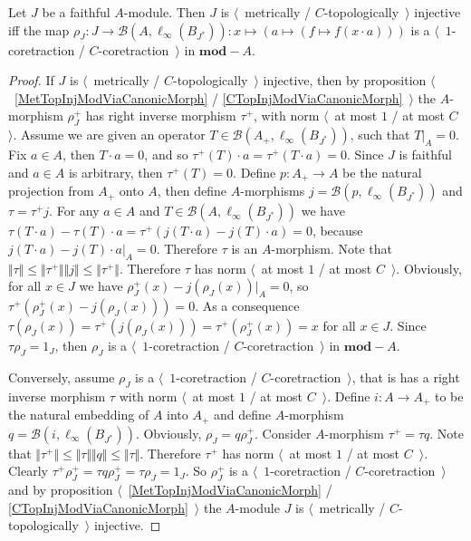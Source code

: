 \begin{proposition}\label{NonDegenMetTopInjCharac}  Let $J$ be a faithful $A$-module. Then $J$ is $\langle$~metrically / $C$-topologically~$\rangle$ injective iff the map $\rho_J:J\to\mathcal{B}(A,\ell_\infty(B_{J^*})):x\mapsto(a\mapsto(f\mapsto f(x\cdot a)))$ is a $\langle$~$1$-coretraction / $C$-coretraction~$\rangle$ in $\mathbf{mod}-A$.
\end{proposition} 
\begin{proof}
If $J$ is $\langle$~metrically / $C$-topologically~$\rangle$ injective, then by proposition $\langle$~\ref{MetTopInjModViaCanonicMorph} / \ref{CTopInjModViaCanonicMorph}~$\rangle$ the $A$-morphism $\rho_J^+$ has right inverse morphism $\tau^+$, with norm $\langle$~at most $1$ / at most $C$~$\rangle$. Assume we are given an operator $T\in \mathcal{B}(A_+,\ell_\infty(B_{J^*}))$, such that $T|_A=0$. Fix $a\in A$, then $T\cdot a=0$, and so $\tau^+(T)\cdot a=\tau^+(T\cdot a)=0$. Since $J$ is faithful and $a\in A$ is arbitrary, then $\tau^+(T)=0$. Define $p:A_+\to A$ be the natural projection from $A_+$ onto $A$, then define $A$-morphisms $j=\mathcal{B}(p,\ell_\infty(B_{J^*}))$ and $\tau =\tau^+ j$. For any $a\in A$ and $T\in\mathcal{B}(A,\ell_\infty(B_{J^*}))$ we have $\tau (T\cdot a)-\tau (T)\cdot a=\tau^+(j(T\cdot a)-j(T)\cdot a)=0$, because $j(T\cdot a)-j(T)\cdot a|_A=0$. Therefore $\tau $ is an $A$-morphism. Note that $\Vert\tau \Vert\leq\Vert\tau^+\Vert\Vert j\Vert\leq \Vert\tau^+\Vert$. Therefore $\tau$ has norm $\langle$~at most $1$ / at most $C$~$\rangle$. Obviously, for all $x\in J$ we have $\rho_J^+(x)-j(\rho_J(x))|_A=0$, so $\tau^+(\rho_J^+(x)-j(\rho_J(x)))=0$. As a consequence $\tau (\rho_J(x))=\tau^+(j(\rho_J(x)))=\tau^+(\rho_J^+(x))=x$ for all $x\in J$. Since $\tau \rho_J=1_J$, then $\rho_J$ is a  $\langle$~$1$-coretraction / $C$-coretraction~$\rangle$  in $\mathbf{mod}-A$.

Conversely, assume $\rho_J$ is a $\langle$~$1$-coretraction / $C$-coretraction~$\rangle$, that is has a right inverse morphism $\tau $ with norm $\langle$~at most $1$ / at most $C$~$\rangle$. Define $i:A\to A_+$ to be the natural embedding of $A$ into $A_+$ and define $A$-morphism $q=\mathcal{B}(i,\ell_\infty(B_{J^*}))$. Obviously, $\rho_J=q\rho_J^+$. Consider $A$-morphism $\tau^+=\tau q$. Note that $\Vert\tau^+\Vert\leq\Vert\tau \Vert\Vert q\Vert\leq \Vert\tau \Vert$. Therefore $\tau^+$ has norm $\langle$~at most $1$ / at most $C$~$\rangle$. Clearly $\tau^+\rho_J^+=\tau q\rho_J^+=\tau \rho_J=1_J$. So $\rho_J^+$ is a $\langle$~$1$-coretraction / $C$-coretraction~$\rangle$ and by proposition $\langle$~\ref{MetTopInjModViaCanonicMorph} / \ref{CTopInjModViaCanonicMorph}~$\rangle$ the $A$-module $J$ is $\langle$~metrically / $C$-topologically~$\rangle$ injective.
\end{proof}

